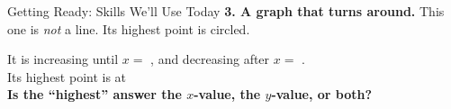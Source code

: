 \documentclass[12pt]{article}
\newcommand{\lgrid}[4]{%
  \draw[step=1, linegray!40, very thin] (#1,#3) grid (#2,#4);
  \draw[->, semithick, charcoal] (#1,0)--(#2,0) node[below right, font=\scriptsize]{$x$};
  \draw[->, semithick, charcoal] (0,#3)--(0,#4) node[left, font=\scriptsize]{$y$};}
\newcommand{\fdot}[3]{\fill[#1] (#2,#3) circle (3.2pt);}
\begin{document}
\begin{notesbox}{Getting Ready: Skills We'll Use Today}
\vspace{6pt}
\textbf{3. A graph that turns around.} This one is \emph{not} a line. Its highest point is
circled.
\begin{minipage}[c]{0.60\linewidth}
  It is increasing until $x=$ \blank{1.2cm}, and decreasing after $x=$ \blank{1.2cm}. \\[5pt]
  Its highest point is at \blank{2.0cm} \\[5pt]
  \textbf{Is the ``highest'' answer the $x$-value, the $y$-value, or both?} \\[3pt]
  \blank{6.4cm}
\end{minipage}\hfill
\begin{minipage}[c]{0.36\linewidth}\centering
{}
\end{minipage}
\end{notesbox}
\end{document}
